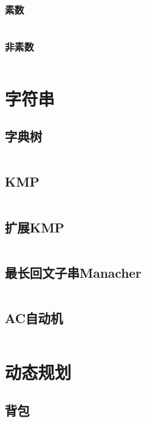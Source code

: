 \documentclass[twoside,sub3section,UTF8]{ctexart}						%
\begin{document}
		\subsubsection{素数}
		\inputminted{c++}{Maths/CRT(prime).cpp}
		\subsubsection{非素数}
		\inputminted{c++}{Maths/CRT(notprime).cpp}

\section{字符串}
	\subsection{字典树}
	\inputminted{c++}{String/Trie.cpp}
	\subsection{KMP}
	\inputminted{c++}{String/KMP.cpp}
	\subsection{扩展KMP}
	\inputminted{c++}{String/EXKMP.cpp}
	\subsection{最长回文子串Manacher}
	\inputminted{c++}{String/Manacher.cpp}
	\subsection{AC自动机}
	\inputminted{c++}{String/AC.cpp}

\section{动态规划}
	\subsection{背包}
	\inputminted{c++}{Dynamic Programme/bag.cpp}
\end{document}
